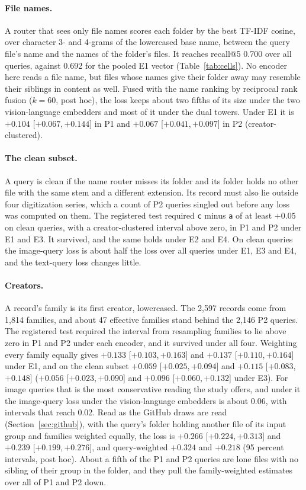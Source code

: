\documentclass[sigconf,natbib=true,anonymous=true]{acmart}
\newcommand{\rep}[1]{\texttt{#1}}
\newcommand{\ci}[2]{[\ensuremath{#1},\,\ensuremath{#2}]}  %
\begin{document}
\paragraph{File names.} A router that sees only file names scores each folder by the best TF-IDF cosine, over character 3- and 4-grams of the lowercased base name, between the query file's name and the names of the folder's files. It reaches recall@5 0.700 over all queries, against 0.692 for the pooled E1 vector (Table~\ref{tab:cells}). No encoder here reads a file name, but files whose names give their folder away may resemble their siblings in content as well. Fused with the name ranking by reciprocal rank fusion ($k = 60$, post hoc), the loss keeps about two fifths of its size under the two vision-language embedders and most of it under the dual towers. Under E1 it is $+0.104$ \ci{+0.067}{+0.144} in P1 and $+0.067$ \ci{+0.041}{+0.097} in P2 (creator-clustered).

\paragraph{The clean subset.} A query is clean if the name router misses its folder and its folder holds no other file with the same stem and a different extension. Its record must also lie outside four digitization series, which a count of P2 queries singled out before any loss was computed on them. The registered test required \rep{c} minus \rep{a} of at least $+0.05$ on clean queries, with a creator-clustered interval above zero, in P1 and P2 under E1 and E3. It survived, and the same holds under E2 and E4. On clean queries the image-query loss is about half the loss over all queries under E1, E3 and E4, and the text-query loss changes little.

\paragraph{Creators.} A record's family is its first creator, lowercased. The 2,597 records come from 1,814 families, and about 47 effective families stand behind the 2,146 P2 queries. The registered test required the interval from resampling families to lie above zero in P1 and P2 under each encoder, and it survived under all four. Weighting every family equally gives $+0.133$ \ci{+0.103}{+0.163} and $+0.137$ \ci{+0.110}{+0.164} under E1, and on the clean subset $+0.059$ \ci{+0.025}{+0.094} and $+0.115$ \ci{+0.083}{+0.148} ($+0.056$ \ci{+0.023}{+0.090} and $+0.096$ \ci{+0.060}{+0.132} under E3). For image queries that is the most conservative reading the study offers, and under it the image-query loss under the vision-language embedders is about 0.06, with intervals that reach 0.02. Read as the GitHub draws are read (Section~\ref{sec:github}), with the query's folder holding another file of its input group and families weighted equally, the loss is $+0.266$ \ci{+0.224}{+0.313} and $+0.239$ \ci{+0.199}{+0.276}, and query-weighted $+0.324$ and $+0.218$ (95 percent intervals, post hoc). About a fifth of the P1 and P2 queries are lone files with no sibling of their group in the folder, and they pull the family-weighted estimates over all of P1 and P2 down.
\end{document}
